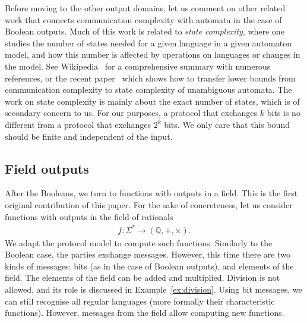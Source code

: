 
Before moving to the other output domains, let us comment on other related work that connects communication complexity with automata in the case of Boolean outputs.  Much of this work is related to \emph{state complexity}, where one studies  the number of states needed for a given language in a given automaton model, and how this number is affected by operations on languages or changes in the model. See  Wikipedia~\cite{stateComplexityWiki} for a comprehensive summary with numerous references, or the recent paper~\cite{goosKiefer2022} which shows how to transfer lower bounds from communication complexity to state complexity of unambiguous automata. 
 The work on state complexity is mainly about the exact number of states, which is of secondary concern to us. For our purposes, a protocol that exchanges $k$ bits is no different from a protocol that exchanges $2^k$ bits. We only care that this bound should be finite and independent of the input.



\subsection{Field outputs}
\label{sec:intro-field}



After the Booleans, we turn to functions with outputs in a field. This is the first original contribution of this paper. For the sake of concreteness, let us  consider functions with outputs in the  field of rationals
\begin{align*}
f : \Sigma^* \to (\mathbb Q, +, \times).
\end{align*}
We adapt the  protocol model to  compute such functions. Similarly to the Boolean case, the parties exchange messages. However, this time there are two kinds of messages: bits (as in the case of  Boolean outputs), and  elements of the field.  The elements of the field can be added and multiplied.  Division is not allowed, and its role is discussed in Example~\ref{ex:division}. Using bit messages, we can still recognise all regular languages (more formally their characteristic functions).
However, messages from the field allow computing new functions.

